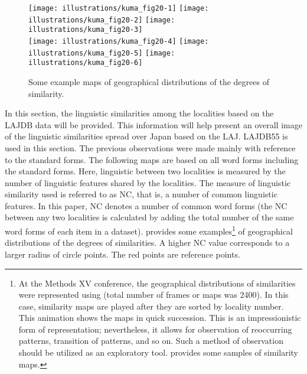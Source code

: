 \documentclass[output=paper]{LSP/langsci}
\begin{document}
\begin{figure}[b]
\texttt{[image: illustrations/kuma\_fig20-1]}
\texttt{[image: illustrations/kuma\_fig20-2]}
\texttt{[image: illustrations/kuma\_fig20-3]}
\\
\texttt{[image: illustrations/kuma\_fig20-4]}
\texttt{[image: illustrations/kuma\_fig20-5]}
\texttt{[image: illustrations/kuma\_fig20-6]}
\caption{Some example maps of geographical distributions of the degrees of similarity.}          
\label{fig:kuma:20}
\end{figure}
In this section, the linguistic similarities among the localities based on the LAJDB data will be provided. This information will help present an overall image of the linguistic similarities spread over Japan based on the LAJ. LAJDB55 is used in this section. The previous observations were made mainly with reference to the standard forms. The following maps are based on all word forms including the standard forms. Here, linguistic  between two localities is measured by the number of linguistic features shared by the localities. The measure of linguistic similarity used is referred to as NC, that is, a number of common linguistic features. In this paper, NC denotes a number of common word forms (the NC between any two localities is calculated by adding the total number of the same word forms of each item in a dataset).  provides some examples\footnote{At the Methods XV conference, the geographical distributions of similarities were represented using  (total number of frames or maps was 2400). In this case, similarity maps are played after they are sorted by locality number. This animation shows the maps in quick succession. This is an impressionistic form of representation; nevertheless, it allows for observation of reoccurring patterns, transition of patterns, and so on. Such a method of observation should be utilized as an exploratory tool.  provides some samples of similarity maps.} of geographical distributions of the degrees of similarities. A higher NC value corresponds to a larger radius of circle points. The red points are reference points.
\end{document}

